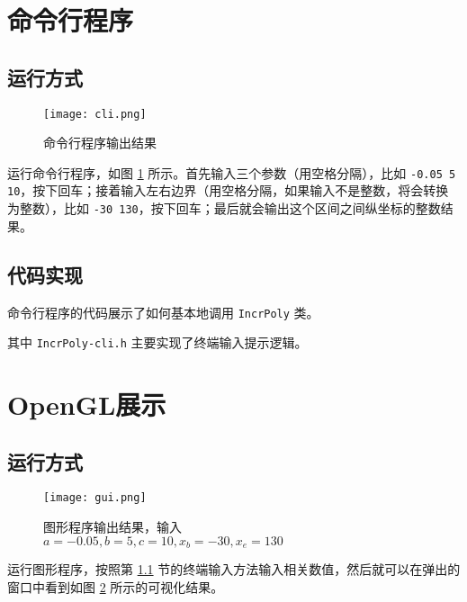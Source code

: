 \documentclass[math-font=newcm]{sjtuarticle}
\providecommand{\code}[2]{}
\begin{document}
\code{../source/IncrPoly/IncrPoly.hpp}{c++}

\section{命令行程序}

\subsection{运行方式}\label{sec:cliinput}

\begin{figure}[h]
    \texttt{[image: cli.png]}
    \caption{命令行程序输出结果}\label{fig:cli}
\end{figure}

运行命令行程序，如图 \ref{fig:cli} 所示。首先输入三个参数（用空格分隔），比如 \verb"-0.05 5 10"，按下回车；接着输入左右边界（用空格分隔，如果输入不是整数，将会转换为整数），比如 \verb"-30 130"，按下回车；最后就会输出这个区间之间纵坐标的整数结果。

\subsection{代码实现}

命令行程序的代码展示了如何基本地调用 \verb"IncrPoly" 类。

\code{../source/IncrPoly/main.cpp}{c++}

\lstset{basicstyle=\ttfamily\scriptsize}

其中 \verb"IncrPoly-cli.h" 主要实现了终端输入提示逻辑。

\code{../source/IncrPoly/IncrPoly-cli.h}{c++}

\section{OpenGL展示}

\subsection{运行方式}

\begin{figure}[h]
    \centering
    \texttt{[image: gui.png]}
    \caption{图形程序输出结果，输入 $a=-0.05,b=5,c=10,x_b=-30,x_e=130$}\label{fig:gui}
\end{figure}

运行图形程序，按照第 \ref{sec:cliinput} 节的终端输入方法输入相关数值，然后就可以在弹出的窗口中看到如图 \ref{fig:gui} 所示的可视化结果。
\end{document}
